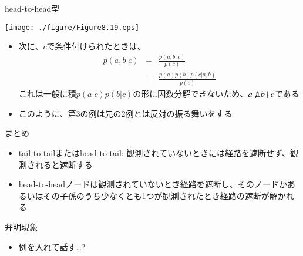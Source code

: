 \begin{frame}{head-to-head型}
 \begin{center}
  \texttt{[image: ./figure/Figure8.19.eps]}
 \end{center}
 \begin{itemize}
  \item 次に、$c$で条件付けられたときは、
        \begin{eqnarray*}
         p(a,b|c) &=& \frac{p(a,b,c)}{p(c)}\\
         &= & \frac{p(a)p(b)p(c|a,b)}{p(c)}
        \end{eqnarray*}
        これは一般に積$p(a|c)p(b|c)$の形に因数分解できないため、$a \nPerp \ b \ | \ c$である
  \item このように、第3の例は先の2例とは反対の振る舞いをする
 \end{itemize}
\end{frame}

\begin{frame}{まとめ}
 \begin{itemize}
  \item tail-to-tailまたはhead-to-tail: 観測されていないときには経路を遮断せず、観測されると遮断する
  \item head-to-headノードは観測されていないとき経路を遮断し、そのノードかあるいはその子孫のうち少なくとも1つが観測されたとき経路の遮断が解かれる
 \end{itemize}
\end{frame}

\begin{frame}{弁明現象}
 \begin{itemize}
  \item 例を入れて話す…?
 \end{itemize}
\end{frame}
